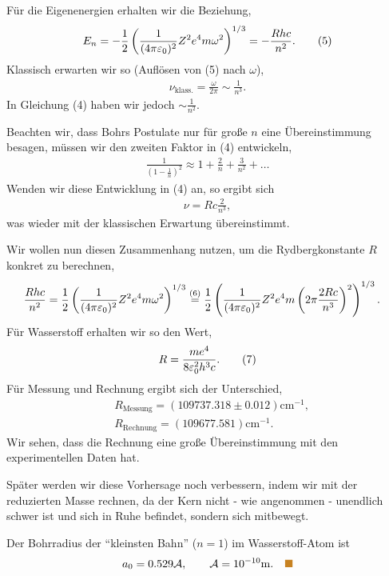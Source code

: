 Für die Eigenenergien erhalten wir die Beziehung,
\begin{align*}
E_n = -\frac{1}{2}\left(\frac{1}{(4\pi\varepsilon_0)^2}Z^2e^4m\omega^2\right)^{1/3} =
-\frac{Rhc}{n^2}.\tag{5}
\end{align*}
Klassisch erwarten wir so (Auflösen von (5) nach $\omega$),
\begin{align*}
\nu_{\text{klass.}} = \frac{\omega}{2\pi} \sim \frac{1}{n^3}.
\end{align*}
In Gleichung (4) haben wir jedoch $\sim\frac{1}{n^2}$.

Beachten wir, dass Bohrs Postulate nur für große $n$ eine Übereinstimmung
besagen, müssen wir den zweiten Faktor in (4) entwickeln,
\begin{align*} 
\frac{1}{\left(1-\frac{1}{n}\right)^2}
\approx 1 + \frac{2}{n} + \frac{3}{n^2}+\ldots
\end{align*}
Wenden wir diese Entwicklung in (4) an, so ergibt sich
\begin{align*}
\nu = Rc\frac{2}{n^3},\tag{6}
\end{align*}
was wieder mit der klassischen Erwartung übereinstimmt.

Wir wollen nun diesen Zusammenhang nutzen, um die Rydbergkonstante $R$ konkret
zu berechnen,
\begin{align*}
&\frac{Rhc}{n^2} = \frac{1}{2}\left(\frac{1}{(4\pi\varepsilon_0)^2}Z^2e^4m\omega^2
\right)^{1/3} \overset{(6)}{=}
\frac{1}{2}\left(\frac{1}{(4\pi\varepsilon_0)^2}Z^2e^4m\left(2\pi \frac{2Rc}{n^3}\right)^2
\right)^{1/3}.
\end{align*}
Für Wasserstoff erhalten wir so den Wert,
\begin{align*}
R = \frac{me^4}{8\varepsilon_0^2 h^3 c}.\tag{7}
\end{align*}
Für Messung und Rechnung ergibt sich der Unterschied,
\begin{align*}
&R_{\text{Messung}} = (109737.318\pm 0.012)\mathrm{cm^{-1}},\\
&R_{\text{Rechnung}} = (109677.581)\mathrm{cm^{-1}}.
\end{align*}
Wir sehen, dass die Rechnung eine große Übereinstimmung mit den experimentellen
Daten hat.

Später werden wir diese Vorhersage noch verbessern, indem wir mit der
reduzierten Masse rechnen, da der Kern nicht - wie angenommen - unendlich
schwer ist und sich in Ruhe befindet, sondern sich mitbewegt.

\begin{bspn}
Der Bohrradius der ``kleinsten Bahn'' ($n=1$) im Wasserstoff-Atom ist
\begin{align*}
a_0 = 0.529 \AA,\qquad \AA = 10^{-10}\mathrm{m}.\bsphere
\end{align*}
\end{bspn}

